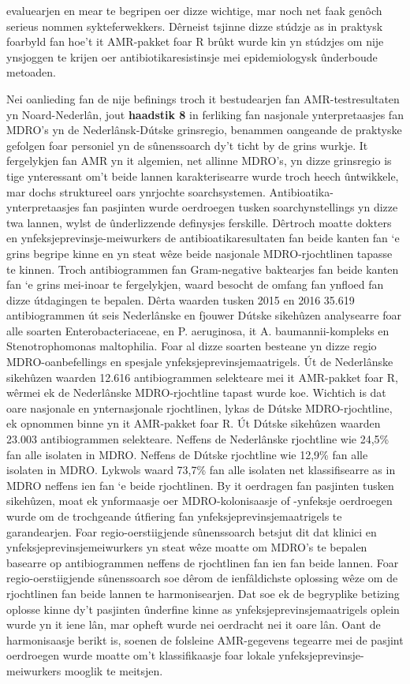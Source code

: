 \documentclass[
]{book}
\begin{document}
evaluearjen en mear te begripen oer dizze wichtige, mar noch net faak genôch serieus nommen sykteferwekkers. Dêrneist tsjinne dizze stúdzje as in praktysk foarbyld fan hoe't it AMR-pakket foar R brûkt wurde kin yn stúdzjes om nije ynsjoggen te krijen oer antibiotikaresistinsje mei epidemiologysk ûnderboude metoaden.

Nei oanlieding fan de nije befinings troch it bestudearjen fan AMR-testresultaten yn Noard-Nederlân, jout \textbf{haadstik 8} in ferliking fan nasjonale ynterpretaasjes fan MDRO's yn de Nederlânsk-Dútske grinsregio, benammen oangeande de praktyske gefolgen foar personiel yn de sûnenssoarch dy't ticht by de grins wurkje. It fergelykjen fan AMR yn it algemien, net allinne MDRO's, yn dizze grinsregio is tige ynteressant om't beide lannen karakterisearre wurde troch heech ûntwikkele, mar dochs struktureel oars ynrjochte soarchsystemen. Antibioatika-ynterpretaasjes fan pasjinten wurde oerdroegen tusken soarchynstellings yn dizze twa lannen, wylst de ûnderlizzende definysjes ferskille. Dêrtroch moatte dokters en ynfeksjeprevinsje-meiwurkers de antibioatikaresultaten fan beide kanten fan `e grins begripe kinne en yn steat wêze beide nasjonale MDRO-rjochtlinen tapasse te kinnen. Troch antibiogrammen fan Gram-negative baktearjes fan beide kanten fan `e grins mei-inoar te fergelykjen, waard besocht de omfang fan ynfloed fan dizze útdagingen te bepalen. Dêrta waarden tusken 2015 en 2016 35.619 antibiogrammen út seis Nederlânske en fjouwer Dútske sikehûzen analysearre foar alle soarten Enterobacteriaceae, en P. aeruginosa, it A. baumannii-kompleks en Stenotrophomonas maltophilia. Foar al dizze soarten besteane yn dizze regio MDRO-oanbefellings en spesjale ynfeksjeprevinsjemaatrigels. Út de Nederlânske sikehûzen waarden 12.616 antibiogrammen selekteare mei it AMR-pakket foar R, wêrmei ek de Nederlânske MDRO-rjochtline tapast wurde koe. Wichtich is dat oare nasjonale en ynternasjonale rjochtlinen, lykas de Dútske MDRO-rjochtline, ek opnommen binne yn it AMR-pakket foar R. Út Dútske sikehûzen waarden 23.003 antibiogrammen selekteare. Neffens de Nederlânske rjochtline wie 24,5\% fan alle isolaten in MDRO. Neffens de Dútske rjochtline wie 12,9\% fan alle isolaten in MDRO. Lykwols waard 73,7\% fan alle isolaten net klassifisearre as in MDRO neffens ien fan `e beide rjochtlinen. By it oerdragen fan pasjinten tusken sikehûzen, moat ek ynformaasje oer MDRO-kolonisaasje of -ynfeksje oerdroegen wurde om de trochgeande útfiering fan ynfeksjeprevinsjemaatrigels te garandearjen. Foar regio-oerstiigjende sûnenssoarch betsjut dit dat klinici en ynfeksjeprevinsjemeiwurkers yn steat wêze moatte om MDRO's te bepalen basearre op antibiogrammen neffens de rjochtlinen fan ien fan beide lannen. Foar regio-oerstiigjende sûnenssoarch soe dêrom de ienfâldichste oplossing wêze om de rjochtlinen fan beide lannen te harmonisearjen. Dat soe ek de begryplike betizing oplosse kinne dy't pasjinten ûnderfine kinne as ynfeksjeprevinsjemaatrigels oplein wurde yn it iene lân, mar opheft wurde nei oerdracht nei it oare lân. Oant de harmonisaasje berikt is, soenen de folsleine AMR-gegevens tegearre mei de pasjint oerdroegen wurde moatte om't klassifikaasje foar lokale ynfeksjeprevinsje-meiwurkers mooglik te meitsjen.
\end{document}

